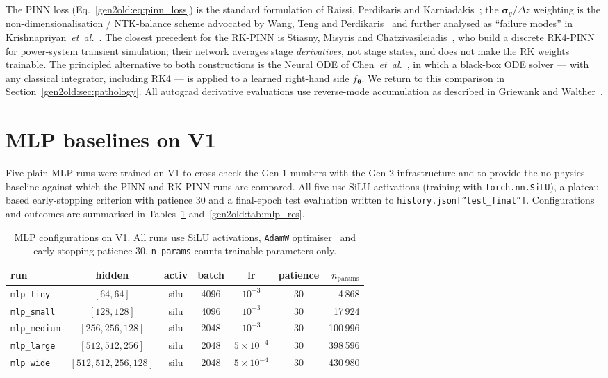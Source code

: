 \documentclass[a4paper,11pt]{article}
\newcommand{\dz}{\Delta z}
\newcommand{\btheta}{\bm{\theta}}
\begin{document}
The PINN loss (Eq.~\ref{gen2old:eq:pinn_loss}) is the standard formulation
of Raissi, Perdikaris and Karniadakis~\cite{raissi2019}; the
$\bm{\sigma}_y/\dz$ weighting is the non-dimensionalisation / NTK-balance
scheme advocated by Wang, Teng and Perdikaris~\cite{wang2021ntk} and further
analysed as ``failure modes'' in Krishnapriyan~\textit{et~al.}~\cite{krishnapriyan2021}.
The closest precedent for the RK-PINN is Stiasny,
Misyris and Chatzivasileiadis~\cite{stiasny2021}, who build a discrete
RK4-PINN for power-system transient simulation; their network averages
stage \emph{derivatives}, not stage states, and does not make the RK
weights trainable. The principled alternative to both constructions is the
Neural ODE of Chen~\textit{et~al.}~\cite{chen2018neuralode}, in which a
black-box ODE solver --- with any classical integrator, including RK4 --- is
applied to a learned right-hand side $f_{\btheta}$. We return to this
comparison in Section~\ref{gen2old:sec:pathology}. All autograd derivative
evaluations use reverse-mode accumulation as described in
Griewank and Walther~\cite{griewank2008}.

\section{MLP baselines on V1}\label{gen2old:sec:mlp}

Five plain-MLP runs were trained on V1 to cross-check the Gen-1 numbers with
the Gen-2 infrastructure and to provide the no-physics baseline against which
the PINN and RK-PINN runs are compared. All five use SiLU activations
(training with \texttt{torch.nn.SiLU}), a plateau-based early-stopping
criterion with patience 30 and a final-epoch test evaluation written to
\texttt{history.json[''test\_final'']}. Configurations and outcomes are
summarised in Tables~\ref{gen2old:tab:mlp_cfg} and~\ref{gen2old:tab:mlp_res}.

\begin{table}[h]
\centering\small
\caption{MLP configurations on V1. All runs use SiLU activations,
\texttt{AdamW} optimiser~\cite{loshchilov2019adamw} and early-stopping
patience 30. \texttt{n\_params} counts trainable parameters only.}
\label{gen2old:tab:mlp_cfg}
\begin{tabular}{lcccccr}
\toprule
run & hidden & activ & batch & lr & patience & $n_{\mathrm{params}}$\\
\midrule
\texttt{mlp\_tiny}   & $[64,64]$             & silu & 4096 & $10^{-3}$ & 30 & 4\,868\\
\texttt{mlp\_small}  & $[128,128]$           & silu & 4096 & $10^{-3}$ & 30 & 17\,924\\
\texttt{mlp\_medium} & $[256,256,128]$       & silu & 2048 & $10^{-3}$ & 30 & 100\,996\\
\texttt{mlp\_large}  & $[512,512,256]$       & silu & 2048 & $5\!\times\!10^{-4}$ & 30 & 398\,596\\
\texttt{mlp\_wide}   & $[512,512,256,128]$   & silu & 2048 & $5\!\times\!10^{-4}$ & 30 & 430\,980\\
\bottomrule
\end{tabular}
\end{table}
\end{document}
